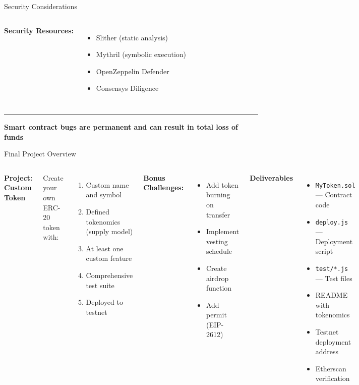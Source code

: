 \documentclass[8pt,aspectratio=169]{beamer}
\newcommand{\bottomnote}[1]{%
\vfill
\vspace{-2mm}
\textcolor{mllavender2}{\rule{\textwidth}{0.4pt}}
\vspace{1mm}
\footnotesize
\textbf{#1}
}
\begin{document}
\begin{frame}[t]{Security Considerations}
\begin{columns}[T]
\vspace{0.3em}
\textbf{Security Resources:}
\begin{itemize}
\item Slither (static analysis)
\item Mythril (symbolic execution)
\item OpenZeppelin Defender
\item Consensys Diligence
\end{itemize}
\end{columns}

\bottomnote{Smart contract bugs are permanent and can result in total loss of funds}
\end{frame}

\begin{frame}[t]{Final Project Overview}
\begin{columns}[T]
\textbf{Project: Custom Token}

Create your own ERC-20 token with:
\begin{enumerate}
\item Custom name and symbol
\item Defined tokenomics (supply model)
\item At least one custom feature
\item Comprehensive test suite
\item Deployed to testnet
\end{enumerate}

\vspace{0.3em}
\textbf{Bonus Challenges:}
\begin{itemize}
\item Add token burning on transfer
\item Implement vesting schedule
\item Create airdrop function
\item Add permit (EIP-2612)
\end{itemize}

\textbf{Deliverables}

\begin{itemize}
\item \texttt{MyToken.sol} --- Contract code
\item \texttt{deploy.js} --- Deployment script
\item \texttt{test/*.js} --- Test files
\item README with tokenomics
\item Testnet deployment address
\item Etherscan verification
\end{itemize}


\end{columns}
\end{frame}
\end{document}
